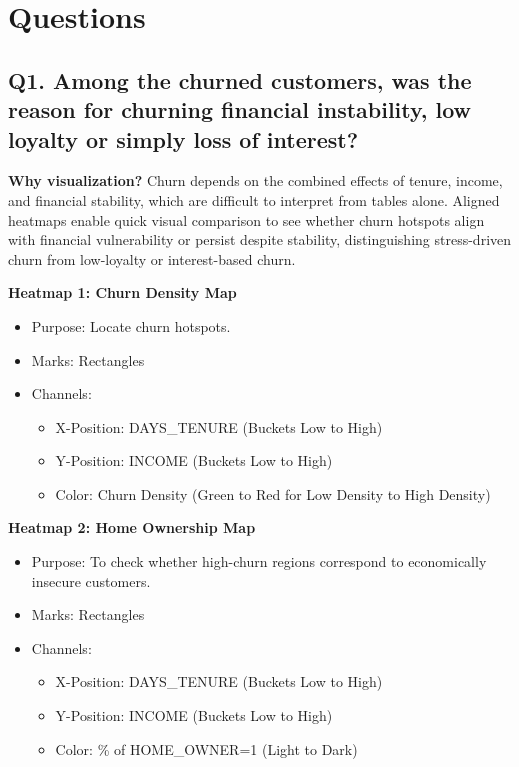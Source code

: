 \documentclass[10pt,a4paper]{article}
\begin{document}
\section*{Questions}

\subsection*{Q1. Among the churned customers, was the reason for churning financial instability, low loyalty or simply loss of interest?}

\textbf{Why visualization?} Churn depends on the combined effects of tenure, income, and financial stability, which are difficult to interpret from tables alone. Aligned heatmaps enable quick visual comparison to see whether churn hotspots align with financial vulnerability or persist despite stability, distinguishing stress-driven churn from low-loyalty or interest-based churn.

\textbf{Heatmap 1: Churn Density Map}
\begin{itemize}[itemsep=0pt]
    \item Purpose: Locate churn hotspots.
    \item Marks: Rectangles
    \item Channels: 
    \begin{itemize}[itemsep=0pt]
        \item X-Position: DAYS\_TENURE (Buckets Low to High)
        \item Y-Position: INCOME (Buckets Low to High)
        \item Color: Churn Density (Green to Red for Low Density to High Density)
    \end{itemize}
\end{itemize}

\textbf{Heatmap 2: Home Ownership Map}
\begin{itemize}[itemsep=0pt]
    \item Purpose: To check whether high-churn regions correspond to economically insecure customers.
    \item Marks: Rectangles
    \item Channels: 
    \begin{itemize}[itemsep=0pt]
        \item X-Position: DAYS\_TENURE (Buckets Low to High)
        \item Y-Position: INCOME (Buckets Low to High)
        \item Color: \% of HOME\_OWNER=1 (Light to Dark)
    \end{itemize}
\end{itemize}
\end{document}

